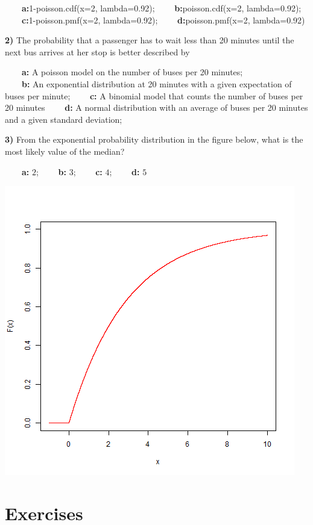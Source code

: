 \documentclass[
]{book}
\begin{document}
\textbf{\(\qquad\)a:}1-poisson.cdf(x=2, lambda=0.92);
\textbf{\(\qquad\)b:}poisson.cdf(x=2, lambda=0.92); \textbf{\(\qquad\)c:}1-poisson.pmf(x=2, lambda=0.92); \textbf{\(\qquad\)d:}poisson.pmf(x=2, lambda=0.92)

\textbf{2)} The probability that a passenger has to wait less than 20 minutes until the next bus arrives at her stop is better described by

\textbf{\(\qquad\)a:} A poisson model on the number of buses per 20 minutes;\\
\textbf{\(\qquad\)b:} An exponential distribution at 20 minutes with a given expectation of buses per minute;
\textbf{\(\qquad\)c:} A binomial model that counts the number of buses per 20 minutes
\textbf{\(\qquad\)d:} A normal distribution with an average of buses per 20 minutes and a given standard deviation;

\textbf{3)} From the exponential probability distribution in the figure below, what is the most likely value of the median?

\textbf{\(\qquad\)a:} \(2\); \textbf{\(\qquad\)b:} \(3\); \textbf{\(\qquad\)c:} \(4\); \textbf{\(\qquad\)d:} \(5\)

\includegraphics{./figures/exp.png}

\hypertarget{exercises-6}{%
\section{Exercises}\label{exercises-6}}
\end{document}
